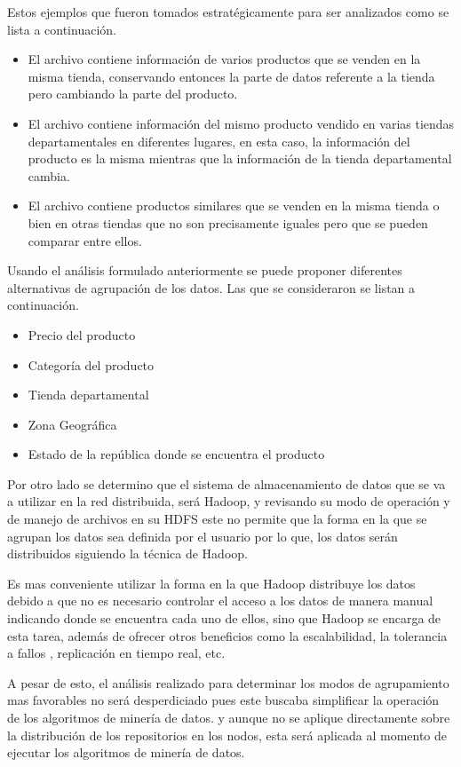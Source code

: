Estos ejemplos que fueron tomados estratégicamente para ser analizados como se lista a continuación.
\begin{itemize}
	\item El archivo contiene información de varios productos que se venden en la misma tienda, conservando entonces la parte de datos referente a la tienda pero cambiando la parte del producto.
	\item El archivo contiene información del mismo producto vendido en varias tiendas departamentales en diferentes lugares, en esta caso, la información del producto es la misma mientras que la información de la tienda departamental cambia.
	\item El archivo contiene productos similares que se venden en la misma tienda o bien en otras tiendas que no son precisamente iguales pero que se pueden comparar entre ellos.
\end{itemize}
Usando el análisis formulado anteriormente se puede proponer diferentes alternativas de agrupación de los datos. Las que se consideraron se listan a continuación.
\begin{itemize}
	\item Precio del producto
	\item Categoría del producto
	\item Tienda departamental
	\item Zona Geográfica
	\item Estado de la república donde se encuentra el producto 
\end{itemize}

Por otro lado se determino que el sistema de almacenamiento de datos que se va a utilizar en la red distribuida, será Hadoop, y revisando su modo de operación y de manejo de archivos en su HDFS este no permite que la forma en la que se agrupan los datos sea definida por el usuario por lo que, los datos serán distribuidos siguiendo la técnica de Hadoop.

Es mas conveniente utilizar la forma en la que Hadoop distribuye los datos debido a que no es necesario controlar el acceso a los datos de manera manual indicando donde se encuentra cada uno de ellos, sino que Hadoop se encarga de esta tarea, además de ofrecer otros beneficios como la escalabilidad, la tolerancia a fallos , replicación en tiempo real, etc. 

A pesar de esto, el análisis realizado para determinar los modos de agrupamiento mas favorables no será desperdiciado pues este buscaba simplificar la operación de los algoritmos de minería de datos. y aunque no se aplique directamente sobre la distribución de los repositorios en los nodos, esta será aplicada al momento de ejecutar los algoritmos de minería de datos. 

